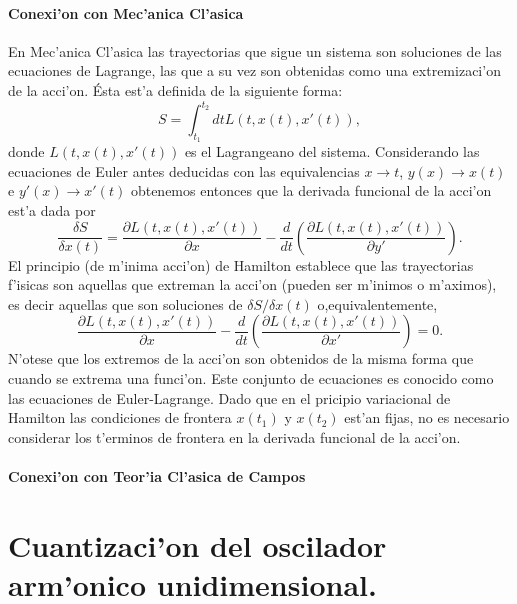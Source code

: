 \subsubsection{Conexi'on con Mec'anica Cl'asica}

En Mec'anica Cl'asica las trayectorias que sigue un sistema son soluciones de las
ecuaciones de Lagrange, las que a su vez son obtenidas como una extremizaci'on de
la acci'on. Ésta est'a definida de la siguiente forma:
\begin{equation}
S=\int_{t_1}^{t_2}dt L(t, x(t), x'(t)),
\end{equation}
donde $L(t, x(t), x'(t))$ es el Lagrangeano del sistema. Considerando las
ecuaciones de Euler antes deducidas con las equivalencias $x\rightarrow t$,
$y(x)\rightarrow x(t)$ e $y'(x)\rightarrow x'(t)$ obtenemos entonces que la
derivada funcional de la acci'on est'a dada por
\begin{equation}
\frac{\delta S}{\delta x(t)}=
\frac{\partial L(t,x(t),x'(t))}{\partial x}
-\frac{d}{dt}
\left( 
\frac{\partial L(t,x(t),x'(t))}{\partial y'}
\right).
\end{equation}
El principio (de m'inima acci'on) de Hamilton establece que las trayectorias
f'isicas son aquellas que extreman la acci'on (pueden ser m'inimos o m'aximos), es
decir aquellas que son soluciones de $\delta S/\delta x(t)$ o,equivalentemente,
\begin{equation}
\frac{\partial L(t,x(t),x'(t))}{\partial x}
-\frac{d}{dt}
\left( 
\frac{\partial L(t,x(t),x'(t))}{\partial x'}
\right)=0.
\end{equation}
N'otese que los extremos de la acci'on son obtenidos de la misma forma que cuando
se extrema una funci'on. Este conjunto de ecuaciones es conocido como las
ecuaciones de Euler-Lagrange. Dado que en el pricipio variacional de Hamilton
las condiciones de frontera $x(t_1)$ y $x(t_2)$ est'an fijas, no es necesario
considerar los t'erminos de frontera en la derivada funcional de la acci'on.

\subsubsection{Conexi'on con Teor'ia Cl'asica de Campos}



\chapter{Cuantizaci'on del oscilador arm'onico unidimensional.}

